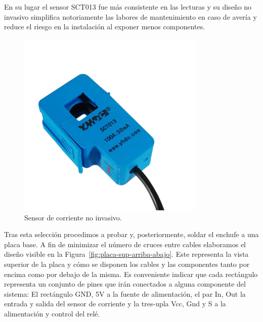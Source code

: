 \documentclass[a4paper,10pt]{article}
\begin{document}
En su lugar el sensor SCT013 fue más consistente en las lecturas y su
diseño no invasivo simplifica notoriamente las labores de
mantenimiento en caso de avería y reduce el riesgo en la instalación
al exponer menos componentes.

\begin{figure}[H]
  \centering
  \includegraphics[width=0.8\textwidth]{img/sct013.png}
  \caption{Sensor de corriente no invasivo.}\label{fig:sct013}
\end{figure}



Tras esta selección procedimos a probar y, posteriormente, soldar el
enchufe a una placa base. A fin de minimizar el número de cruces entre
cables elaboramos el diseño visible en
la Figura~\ref{fig:placa-sup-arriba-abajo}. Este representa la vista superior de
la placa y cómo se disponen los cables y las componentes tanto por
encima como por debajo de la misma. Es conveniente indicar que cada
rectángulo representa un conjunto de pines que irán conectados a
alguna componente del sistema: El rectángulo GND, 5V a la fuente de
alimentación, el par In, Out la entrada y salida del sensor de
corriente y la tres-upla Vcc, Gnd y S a la alimentación y control del
relé.
\end{document}
